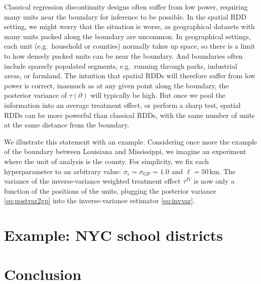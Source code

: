 \documentclass[letter]{article}
\newcommand{\sigmaf}{\sigma_{\mathrm{GP}}}
\newcommand{\sigman}{\sigma_{\epsilon}}
\newcommand{\boundary}{\partial}
\newcommand{\invvar}{\tau^{IV}}
\begin{document}
Classical regression discontinuity designs often suffer from low power,
requiring many units near the boundary for inference to be possible. In
the spatial RDD setting, we might worry that the situation is worse, as
geographical datasets with many units packed along the boundary are
uncommon. In geographical settings, each unit (e.g.~household or
counties) normally takes up space, so there is a limit to how densely
packed units can be near the boundary. And boundaries often include
sparsely populated segments, e.g.~running through parks, industrial
areas, or farmland. The intuition that spatial RDDs will therefore
suffer from low power is correct, inasmuch as at any given point along
the boundary, the posterior variance of \(\tau(\boundary)\) will
typically be high. But once we pool the information into an average
treatment effect, or perform a sharp test, spatial RDDs can be more
powerful than classical RDDs, with the same number of units at the same
distance from the boundary.

We illustrate this statement with an example. Considering once more the
example of the boundary between Louisiana and Mississippi, we imagine an
experiment where the unit of analysis is the county. For simplicity, we
fix each hyperparameter to an arbitrary value: \(\sigman=\sigmaf=1.0\)
and \(\ell=50\,\mathrm{km}\). The variance of the inverse-variance
weighted treatment effect \(\invvar\) is now only a function of the
positions of the units, plugging the posterior variance
\eqref{eq:postvar2gp} into the inverse-variance estimator
\eqref{eq:invvar}.
    


    	\section{Example: NYC school
districts}\label{example-nyc-school-districts}

\section{Conclusion}\label{conclusion}
    



    
    
    
    
\end{document}
